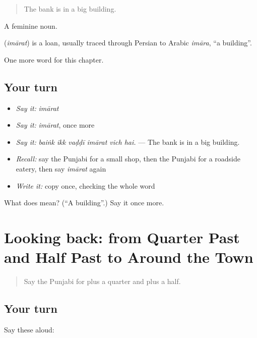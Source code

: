 \begin{quote}
The bank is in a big building.
\end{quote}

A feminine noun.

\begin{cousinweb}
\textbf{} (\emph{imārat}) is a loan, usually traced through Persian to Arabic \emph{imāra}, \textquotedblleft{}a building\textquotedblright{}.
\end{cousinweb}

\begin{grammarlens}[title={What you've built}]
One more word for this chapter.
\end{grammarlens}

\subsection*{Your turn}
\begin{itemize}
\raggedright
  \item \emph{Say it:} \emph{imārat}
  \item \emph{Say it:} \emph{imārat}, once more
  \item \emph{Say it:} \emph{baiṅk ikk vaḍḍī imārat vich hai.} — The bank is in a big building.
  \item \emph{Recall:} say the Punjabi for a small shop, then the Punjabi for a roadside eatery, then say \emph{imārat} again
  \item \emph{Write it:} copy \textbf{} once, checking the whole word
\end{itemize}

\begin{tcolorbox}[breakable,colback=teal!4,colframe=teal!35!black,title={Before you move on}]
What does  mean? (\textquotedblleft{}A building\textquotedblright{}.) Say it once more.
\end{tcolorbox}
\section[(dialogue)]{Looking back: from Quarter Past and Half Past to Around the Town}

\label{lesson:PA-R266-review-260-266}



\begin{quote}
Say the Punjabi for plus a quarter and plus a half.
\end{quote}

\subsection*{Your turn}
Say these aloud:

